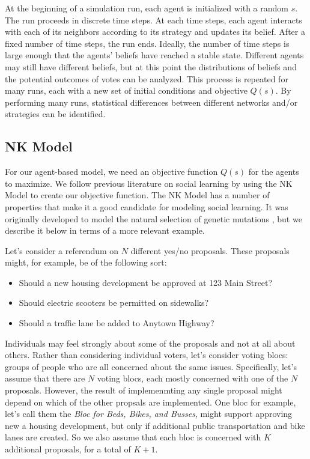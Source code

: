 \documentclass[manuscript,screen,review,acmsmall]{acmart}
\begin{document}
At the beginning of a simulation run, each agent is initialized with a random $s$.
The run proceeds in discrete time steps.
At each time steps, each agent interacts with each of its neighbors according to its strategy and
updates its belief.
After a fixed number of time steps, the run ends.
Ideally, the number of time steps is large enough that
the agents' beliefs have reached a stable state.
Different agents may still have different beliefs,
but at this point the distributions of beliefs and the potential outcomes of votes can be analyzed.
This process is repeated for many runs,
each with a new set of initial conditions and objective $Q(s)$.
By performing many runs, statistical differences between different networks and/or strategies can be identified.

\subsection{NK Model\label{subsec:nk}}
For our agent-based model, we need an objective function $Q(s)$ for the agents to maximize.
We follow previous literature on social learning
\cite{lazer_network_2007,barkoczi_social_2016,gomez_clustering_2019}
by using the NK Model \cite{kauffman_towards_1987,weinberger_local_1991} to create our objective function.
The NK Model has a number of properties that make it a good candidate for modeling social learning.
It was originally developed to model the natural selection of genetic mutations \cite{kauffman_towards_1987},
but we describe it below in terms of a more relevant example.

Let's consider a referendum on $N$ different yes/no proposals.
These proposals might, for example, be of the following sort:
\begin{itemize}
    \item{Should a new housing development be approved at 123 Main Street?}
    \item{Should electric scooters be permitted on sidewalks?}
    \item{Should a traffic lane be added to Anytown Highway?}
\end{itemize}

Individuals may feel strongly about some of the proposals and not at all about others.
Rather than considering individual voters, let's consider voting blocs:
groups of people who are all concerned about the same issues.
Specifically, let's assume that there are $N$ voting blocs, each mostly concerned with one of the $N$ proposals.
However, the result of implemenmting any single proposal might depend on which of the other propsals are implemented.
One bloc for example, let's call them the {\em Bloc for Beds, Bikes, and Busses}, might support approving new a housing development,
but only if additional public transportation and bike lanes are created.
So we also assume that each bloc is concerned with $K$ additional proposals, for a total of $K+1$.
\end{document}
